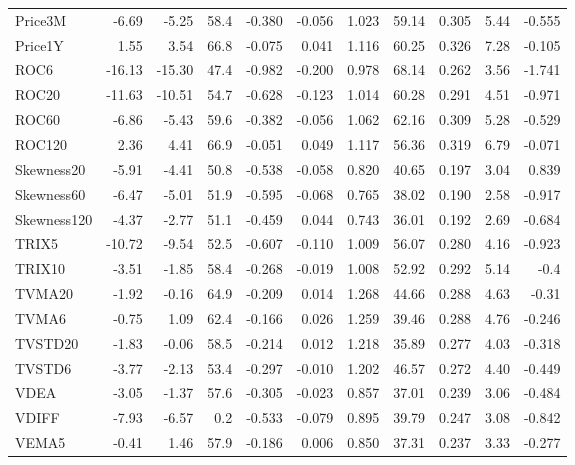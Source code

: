 \documentclass[preprint,12pt]{elsarticle}
\begin{document}
{\begin{longtable}{lrrrrrrrrrr}
    Price3M &   -6.69 &  -5.25 &   58.4 &   -0.380 & -0.056 & 1.023 &     59.14 & 0.305 & 5.44 & -0.555 \\
    Price1Y &   1.55 &  3.54 &   66.8 &   -0.075 & 0.041 & 1.116 &     60.25 & 0.326 & 7.28 & -0.105 \\
    ROC6 &   -16.13 &  -15.30 &   47.4 &   -0.982 & -0.200 & 0.978 &     68.14 & 0.262 & 3.56 & -1.741 \\
    ROC20 &   -11.63 &  -10.51 &   54.7 &   -0.628 & -0.123 & 1.014 &     60.28 & 0.291 & 4.51 & -0.971 \\
    ROC60 &   -6.86 &  -5.43 &   59.6 &   -0.382 & -0.056 & 1.062 &     62.16 & 0.309 & 5.28 & -0.529 \\
    ROC120 &   2.36 &  4.41 &   66.9 &   -0.051 & 0.049 & 1.117 &  56.36 & 0.319 & 6.79 & -0.071 \\
    Skewness20 &   -5.91 &  -4.41 &   50.8 &   -0.538 & -0.058 & 0.820 &     40.65 & 0.197 & 3.04 & 0.839 \\
    Skewness60 &   -6.47 &  -5.01 &   51.9 &   -0.595 & -0.068 & 0.765 &     38.02 & 0.190 & 2.58 & -0.917  \\
    Skewness120 &   -4.37 &  -2.77 &   51.1 &   -0.459 & 0.044 & 0.743 &     36.01 & 0.192 & 2.69 & -0.684 \\
    TRIX5 &   -10.72 &  -9.54 &   52.5 &   -0.607 & -0.110 & 1.009 &     56.07 & 0.280 & 4.16 & -0.923 \\
    TRIX10 &   -3.51 &  -1.85 &   58.4 &   -0.268 & -0.019 & 1.008 &     52.92 & 0.292 & 5.14 & -0.4  \\
    TVMA20 &   -1.92 &  -0.16 &   64.9 &   -0.209 & 0.014 & 1.268 &     44.66 & 0.288 & 4.63 & -0.31 \\
    TVMA6 &   -0.75 &  1.09 &   62.4 &   -0.166 & 0.026 & 1.259 &     39.46 & 0.288 & 4.76 & -0.246  \\
    TVSTD20 &   -1.83 &  -0.06 &   58.5 &   -0.214 & 0.012 & 1.218 &   35.89 & 0.277 & 4.03 & -0.318 \\
    TVSTD6 &   -3.77 &  -2.13 &   53.4 &   -0.297 & -0.010 & 1.202 &   46.57 & 0.272 & 4.40 & -0.449 \\
    VDEA &   -3.05 &  -1.37 &   57.6 &   -0.305 & -0.023 & 0.857 &     37.01 & 0.239 & 3.06 & -0.484  \\
    VDIFF &   -7.93 &  -6.57 &   0.2 &   -0.533 & -0.079 & 0.895 &     39.79 & 0.247 & 3.08 & -0.842  \\
    VEMA5 &   -0.41 &  1.46 &   57.9 &   -0.186 & 0.006 & 0.850 &     37.31 & 0.237 & 3.33& -0.277 \\

\end{longtable}}
\end{document}
